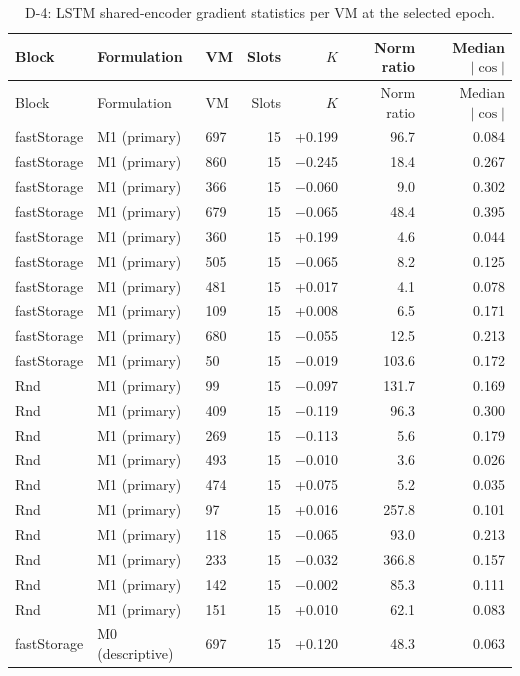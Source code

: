 \begin{longtable}{@{}lllrrrr@{}}
\caption{D-4: LSTM shared-encoder gradient statistics per VM at the selected epoch.}\label{tab:supp-t2-d4}\\
\toprule
Block & Formulation & VM & Slots & $K$ & Norm ratio & Median $|\cos|$ \\
\midrule
\endfirsthead
\toprule
Block & Formulation & VM & Slots & $K$ & Norm ratio & Median $|\cos|$ \\
\midrule
\endhead
\bottomrule
\endfoot
fastStorage & M1 (primary) & 697 & 15 & +0.199 & 96.7 & 0.084 \\
fastStorage & M1 (primary) & 860 & 15 & $-$0.245 & 18.4 & 0.267 \\
fastStorage & M1 (primary) & 366 & 15 & $-$0.060 & 9.0 & 0.302 \\
fastStorage & M1 (primary) & 679 & 15 & $-$0.065 & 48.4 & 0.395 \\
fastStorage & M1 (primary) & 360 & 15 & +0.199 & 4.6 & 0.044 \\
fastStorage & M1 (primary) & 505 & 15 & $-$0.065 & 8.2 & 0.125 \\
fastStorage & M1 (primary) & 481 & 15 & +0.017 & 4.1 & 0.078 \\
fastStorage & M1 (primary) & 109 & 15 & +0.008 & 6.5 & 0.171 \\
fastStorage & M1 (primary) & 680 & 15 & $-$0.055 & 12.5 & 0.213 \\
fastStorage & M1 (primary) & 50 & 15 & $-$0.019 & 103.6 & 0.172 \\
Rnd & M1 (primary) & 99 & 15 & $-$0.097 & 131.7 & 0.169 \\
Rnd & M1 (primary) & 409 & 15 & $-$0.119 & 96.3 & 0.300 \\
Rnd & M1 (primary) & 269 & 15 & $-$0.113 & 5.6 & 0.179 \\
Rnd & M1 (primary) & 493 & 15 & $-$0.010 & 3.6 & 0.026 \\
Rnd & M1 (primary) & 474 & 15 & +0.075 & 5.2 & 0.035 \\
Rnd & M1 (primary) & 97 & 15 & +0.016 & 257.8 & 0.101 \\
Rnd & M1 (primary) & 118 & 15 & $-$0.065 & 93.0 & 0.213 \\
Rnd & M1 (primary) & 233 & 15 & $-$0.032 & 366.8 & 0.157 \\
Rnd & M1 (primary) & 142 & 15 & $-$0.002 & 85.3 & 0.111 \\
Rnd & M1 (primary) & 151 & 15 & +0.010 & 62.1 & 0.083 \\
fastStorage & M0 (descriptive) & 697 & 15 & +0.120 & 48.3 & 0.063 \\

\end{longtable}
